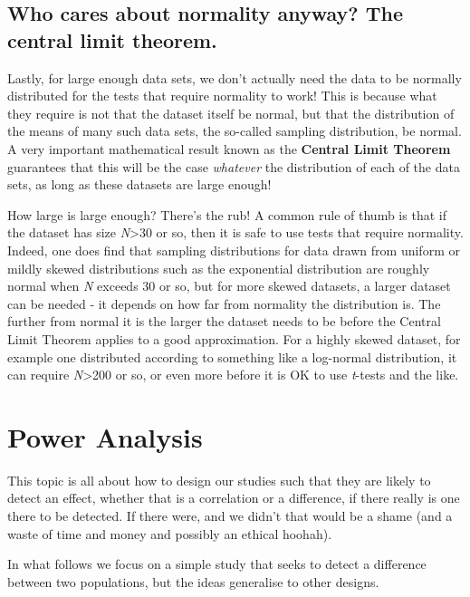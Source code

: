 \documentclass[
  letterpaper,
  DIV=11,
  numbers=noendperiod]{scrreprt}
\begin{document}
\section{Who cares about normality anyway? The central limit
theorem.}\label{who-cares-about-normality-anyway-the-central-limit-theorem.}

Lastly, for large enough data sets, we don't actually need the data to
be normally distributed for the tests that require normality to work!
This is because what they require is not that the dataset itself be
normal, but that the distribution of the means of many such data sets,
the so-called sampling distribution, be normal. A very important
mathematical result known as the \textbf{Central Limit Theorem}
guarantees that this will be the case \emph{whatever} the distribution
of each of the data sets, as long as these datasets are large enough!

How large is large enough? There's the rub! A common rule of thumb is
that if the dataset has size \emph{N}\textgreater30 or so, then it is
safe to use tests that require normality. Indeed, one does find that
sampling distributions for data drawn from uniform or mildly skewed
distributions such as the exponential distribution are roughly normal
when \emph{N} exceeds 30 or so, but for more skewed datasets, a larger
dataset can be needed - it depends on how far from normality the
distribution is. The further from normal it is the larger the dataset
needs to be before the Central Limit Theorem applies to a good
approximation. For a highly skewed dataset, for example one distributed
according to something like a log-normal distribution, it can require
\emph{N}\textgreater200 or so, or even more before it is OK to use
\emph{t}-tests and the like.

\chapter{Power Analysis}\label{power-analysis}

This topic is all about how to design our studies such that they are
likely to detect an effect, whether that is a correlation or a
difference, if there really is one there to be detected. If there were,
and we didn't that would be a shame (and a waste of time and money and
possibly an ethical hoohah).

In what follows we focus on a simple study that seeks to detect a
difference between two populations, but the ideas generalise to other
designs.
\end{document}
